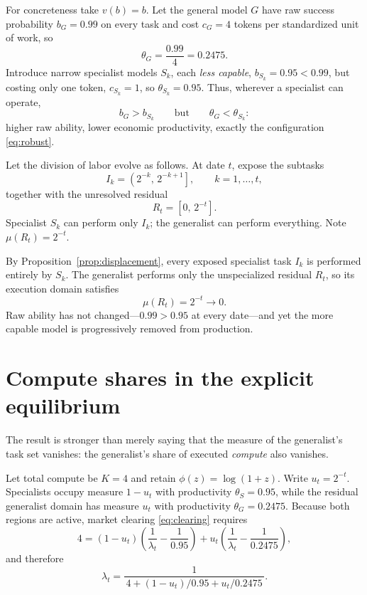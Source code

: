 \documentclass[11pt]{article}
\theoremstyle{definition}
\theoremstyle{remark}
\begin{document}
For concreteness take $v(b) = b$. Let the general model $G$ have raw success probability $b_G = 0.99$ on every task and cost $c_G = 4$ tokens per standardized unit of work, so
\begin{equation}
\theta_G = \frac{0.99}{4} = 0.2475.
\end{equation}
Introduce narrow specialist models $S_k$, each \emph{less capable}, $b_{S_k} = 0.95 < 0.99$, but costing only one token, $c_{S_k} = 1$, so $\theta_{S_k} = 0.95$. Thus, wherever a specialist can operate,
\begin{equation}
b_G > b_{S_k}
\qquad \text{but} \qquad
\theta_G < \theta_{S_k}:
\end{equation}
higher raw ability, lower economic productivity, exactly the configuration \eqref{eq:robust}.

Let the division of labor evolve as follows. At date $t$, expose the subtasks
\begin{equation}
I_k = \left( 2^{-k},\, 2^{-k+1} \right], \qquad k = 1, \ldots, t,
\end{equation}
together with the unresolved residual
\begin{equation}
R_t = \left[ 0,\, 2^{-t} \right].
\end{equation}
Specialist $S_k$ can perform only $I_k$; the generalist can perform everything. Note $\mu(R_t) = 2^{-t}$.

By Proposition~\ref{prop:displacement}, every exposed specialist task $I_k$ is performed entirely by $S_k$. The generalist performs only the unspecialized residual $R_t$, so its execution domain satisfies
\begin{equation}
\mu(R_t) = 2^{-t} \longrightarrow 0.
\end{equation}
Raw ability has not changed---$0.99 > 0.95$ at every date---and yet the more capable model is progressively removed from production.

\section{Compute shares in the explicit equilibrium}
\label{sec:shares}

The result is stronger than merely saying that the measure of the generalist's task set vanishes: the generalist's share of executed \emph{compute} also vanishes.

Let total compute be $K = 4$ and retain $\phi(z) = \log(1+z)$. Write $u_t = 2^{-t}$. Specialists occupy measure $1 - u_t$ with productivity $\theta_S = 0.95$, while the residual generalist domain has measure $u_t$ with productivity $\theta_G = 0.2475$. Because both regions are active, market clearing \eqref{eq:clearing} requires
\begin{equation}
4 = (1 - u_t) \left( \frac{1}{\lambda_t} - \frac{1}{0.95} \right)
  + u_t \left( \frac{1}{\lambda_t} - \frac{1}{0.2475} \right),
\end{equation}
and therefore
\begin{equation}
\lambda_t = \frac{1}{\,4 + (1-u_t)/0.95 + u_t/0.2475\,}.
\end{equation}
\end{document}
